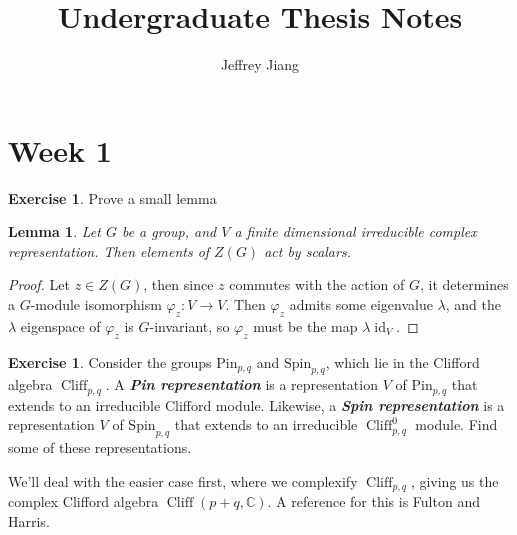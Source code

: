 \documentclass[psamsfonts]{amsart}
\newtheorem*{lem*}{Lemma}
\theoremstyle{definition}
\newtheorem{exer}[thm]{Exercise}
\theoremstyle{remark}
\newcommand{\ib}[1]{\textbf{\textit{#1}}}
\newcommand{\C}{\mathbb{C}}
\newcommand{\Spin}{\mathrm{Spin}}
\newcommand{\Pin}{\mathrm{Pin}}
\DeclareMathOperator{\id}{id}
\DeclareMathOperator{\Cliff}{Cliff}
\begin{document}
%
\author{Jeffrey Jiang}
%
\title{Undergraduate Thesis Notes}
%
\maketitle
%
\setcounter{section}{1}
%
\section*{Week 1}
%
\begin{exer}
Prove a small lemma
\begin{lem*}
Let $G$ be a group, and $V$ a finite dimensional irreducible complex representation. Then elements of $Z(G)$ act by scalars.
\end{lem*}
\end{exer}
\begin{proof}
Let $z \in Z(G)$, then since $z$ commutes with the action of $G$, it determines a $G$-module isomorphism $\varphi_z : V \to V$. Then $\varphi_z$ admits some eigenvalue $\lambda$, and the $\lambda$ eigenspace of $\varphi_z$ is $G$-invariant, so $\varphi_z$ must be the map $\lambda \id_V$.
\end{proof}
%
%
\begin{exer}
Consider the groups $\Pin_{p,q}$ and $\Spin_{p,q}$, which lie in the Clifford algebra $\Cliff_{p,q}$. A \ib{Pin representation} is a representation $V$ of $\Pin_{p,q}$ that extends to an irreducible Clifford module. Likewise, a \ib{Spin representation} is a representation $V$ of $\Spin_{p,q}$ that extends to an irreducible $\Cliff_{p,q}^0$ module. Find some of these representations.
\end{exer}
%
\iffalse
We'll deal with the easier case first, where we complexify $\Cliff_{p,q}$, giving us the complex Clifford algebra $\Cliff(p+q,\C)$. A reference for this is Fulton and Harris. \\
\end{document}
